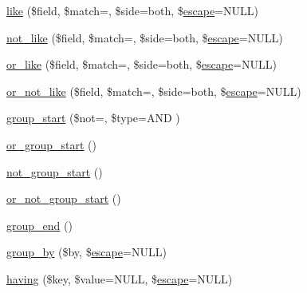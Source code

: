 \begin{DoxyCompactItemize}
\mbox{\hyperlink{class_c_i___d_b__query__builder_ada4c73fd6f292084d8b84b0db958fcc1}{like}} (\$field, \$match=\textquotesingle{}\textquotesingle{}, \$side=\textquotesingle{}both\textquotesingle{}, \$\mbox{\hyperlink{class_c_i___d_b__driver_ac8f37ca5703d4558c732e692194f8cd6}{escape}}=N\+U\+LL)
\item 
\mbox{\hyperlink{class_c_i___d_b__query__builder_ac87c3421e7d396a714740b1a9c0fe8ea}{not\+\_\+like}} (\$field, \$match=\textquotesingle{}\textquotesingle{}, \$side=\textquotesingle{}both\textquotesingle{}, \$\mbox{\hyperlink{class_c_i___d_b__driver_ac8f37ca5703d4558c732e692194f8cd6}{escape}}=N\+U\+LL)
\item 
\mbox{\hyperlink{class_c_i___d_b__query__builder_aef08c014f8925124292fa6a65c014d25}{or\+\_\+like}} (\$field, \$match=\textquotesingle{}\textquotesingle{}, \$side=\textquotesingle{}both\textquotesingle{}, \$\mbox{\hyperlink{class_c_i___d_b__driver_ac8f37ca5703d4558c732e692194f8cd6}{escape}}=N\+U\+LL)
\item 
\mbox{\hyperlink{class_c_i___d_b__query__builder_a37af2f8d33a06c1cc2ad9dafc2c88e90}{or\+\_\+not\+\_\+like}} (\$field, \$match=\textquotesingle{}\textquotesingle{}, \$side=\textquotesingle{}both\textquotesingle{}, \$\mbox{\hyperlink{class_c_i___d_b__driver_ac8f37ca5703d4558c732e692194f8cd6}{escape}}=N\+U\+LL)
\item 
\mbox{\hyperlink{class_c_i___d_b__query__builder_a0ad001f7f7d1a41fdee4a85b4f7db9b4}{group\+\_\+start}} (\$not=\textquotesingle{}\textquotesingle{}, \$type=\textquotesingle{}A\+ND \textquotesingle{})
\item 
\mbox{\hyperlink{class_c_i___d_b__query__builder_a80d5e4a0d8f2d0f202e8df6816865838}{or\+\_\+group\+\_\+start}} ()
\item 
\mbox{\hyperlink{class_c_i___d_b__query__builder_ae0b543e6db440c4a717714b5d5782e7a}{not\+\_\+group\+\_\+start}} ()
\item 
\mbox{\hyperlink{class_c_i___d_b__query__builder_a16a0c2a5f37a7be4c487670650d13faf}{or\+\_\+not\+\_\+group\+\_\+start}} ()
\item 
\mbox{\hyperlink{class_c_i___d_b__query__builder_ad97adc35e18afc9d4f26e0f568cdc6ed}{group\+\_\+end}} ()
\item 
\mbox{\hyperlink{class_c_i___d_b__query__builder_a111cc822f85357c4cfe37886e6315dce}{group\+\_\+by}} (\$by, \$\mbox{\hyperlink{class_c_i___d_b__driver_ac8f37ca5703d4558c732e692194f8cd6}{escape}}=N\+U\+LL)
\item 
\mbox{\hyperlink{class_c_i___d_b__query__builder_af19efb51311e6f648a0035a0f94fceb6}{having}} (\$key, \$value=N\+U\+LL, \$\mbox{\hyperlink{class_c_i___d_b__driver_ac8f37ca5703d4558c732e692194f8cd6}{escape}}=N\+U\+LL)

\end{DoxyCompactItemize}
